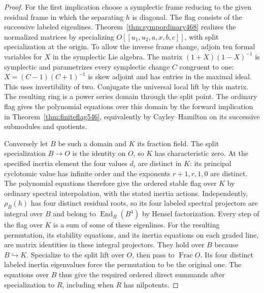 \documentclass[a4paper,11pt]{article}
\theoremstyle{definition}
\theoremstyle{remark}
\numberwithin{equation}{section}
\begin{document}
\begin{proof}
For the first implication choose a symplectic frame reducing
to the given residual frame in which the separating \(h\)
is diagonal. The flag consists of the successive labeled
eigenlines. Theorem~\ref{thm:sympordinary468} realizes the
normalized matrices by specializing \(O[[u_1,u_2,a,x,b,c]]\),
with split specialization at the origin. To allow the inverse
frame change, adjoin ten formal variables for \(X\) in the
symplectic Lie algebra. The matrix \((1+X)(1-X)^{-1}\)
is symplectic and parametrizes every symplectic change \(C\)
congruent to one: \(X=(C-1)(C+1)^{-1}\) is skew adjoint and
has entries in the maximal ideal. This uses invertibility of
two. Conjugate the universal local lift by this matrix. The
resulting ring is a power series domain through the split
point. The ordinary flag gives the polynomial equations over
this domain by the forward implication in
Theorem~\ref{thm:finiteflag546}, equivalently by Cayley--Hamilton
on its successive submodules and quotients.

Conversely let \(B\) be such a domain and \(K\) its fraction
field. The split specialization \(B\to O\) is the identity
on \(O\), so \(K\) has characteristic zero. At the specified
inertia element the four values \(d_i\) are distinct in \(K\):
its principal cyclotomic value has infinite order and the
exponents \(r+1,r,1,0\) are distinct. The polynomial equations
therefore give the ordered stable flag over \(K\) by ordinary
spectral interpolation, with the stated inertia actions.
Independently, \(\rho_B(h)\) has four distinct residual roots,
so its four labeled spectral projectors are integral over \(B\)
and belong to \(\operatorname{End}_B(B^4)\) by Hensel
factorization. Every step of the flag over \(K\) is a sum of
some of these eigenlines. For the resulting permutation, its
stability equations, and its inertia equations on each graded
line, are matrix identities in these integral projectors.
They hold over \(B\) because \(B\hookrightarrow K\). Specialize
to the split lift over \(O\), then pass to \(\operatorname{Frac}O\).
Its four distinct labeled inertia eigenvalues force the
permutation to be the original one. The equations over \(B\)
thus give the required ordered direct summands after
specialization to \(R\), including when \(R\) has nilpotents.
\end{proof}
\end{document}
